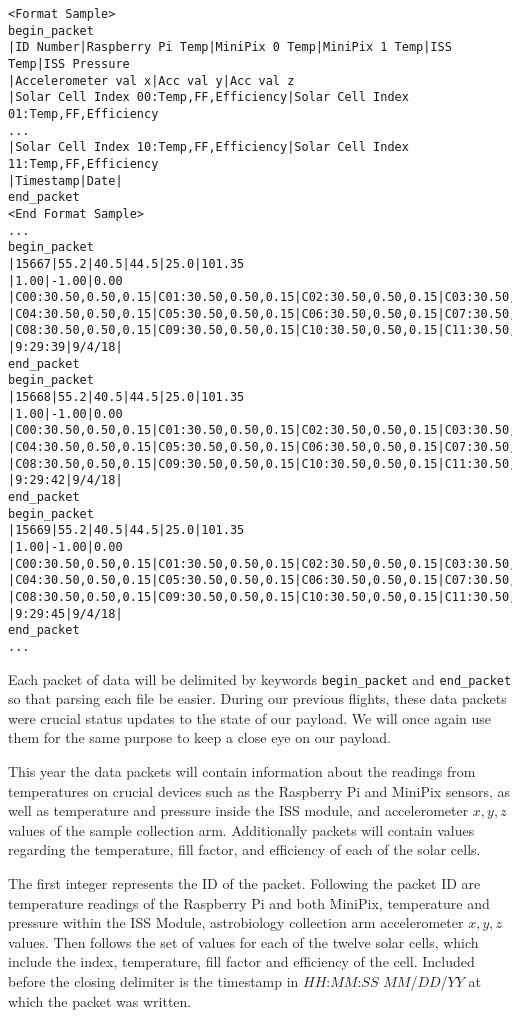 \lstset{basicstyle=\small, numbers=left, xleftmargin=2em, frame=tb, label = Downlinks, framexleftmargin=1.5em}
\begin{lstlisting}[caption = Sample of proposed downlink data packets ID: 15667 - 15670]
<Format Sample>
begin_packet
|ID Number|Raspberry Pi Temp|MiniPix 0 Temp|MiniPix 1 Temp|ISS Temp|ISS Pressure
|Accelerometer val x|Acc val y|Acc val z
|Solar Cell Index 00:Temp,FF,Efficiency|Solar Cell Index 01:Temp,FF,Efficiency
...
|Solar Cell Index 10:Temp,FF,Efficiency|Solar Cell Index 11:Temp,FF,Efficiency
|Timestamp|Date|
end_packet
<End Format Sample>
...
begin_packet
|15667|55.2|40.5|44.5|25.0|101.35
|1.00|-1.00|0.00
|C00:30.50,0.50,0.15|C01:30.50,0.50,0.15|C02:30.50,0.50,0.15|C03:30.50,0.50,0.15
|C04:30.50,0.50,0.15|C05:30.50,0.50,0.15|C06:30.50,0.50,0.15|C07:30.50,0.50,0.15
|C08:30.50,0.50,0.15|C09:30.50,0.50,0.15|C10:30.50,0.50,0.15|C11:30.50,0.50,0.15
|9:29:39|9/4/18|
end_packet
begin_packet
|15668|55.2|40.5|44.5|25.0|101.35
|1.00|-1.00|0.00
|C00:30.50,0.50,0.15|C01:30.50,0.50,0.15|C02:30.50,0.50,0.15|C03:30.50,0.50,0.15
|C04:30.50,0.50,0.15|C05:30.50,0.50,0.15|C06:30.50,0.50,0.15|C07:30.50,0.50,0.15
|C08:30.50,0.50,0.15|C09:30.50,0.50,0.15|C10:30.50,0.50,0.15|C11:30.50,0.50,0.15
|9:29:42|9/4/18|
end_packet
begin_packet
|15669|55.2|40.5|44.5|25.0|101.35
|1.00|-1.00|0.00
|C00:30.50,0.50,0.15|C01:30.50,0.50,0.15|C02:30.50,0.50,0.15|C03:30.50,0.50,0.15
|C04:30.50,0.50,0.15|C05:30.50,0.50,0.15|C06:30.50,0.50,0.15|C07:30.50,0.50,0.15
|C08:30.50,0.50,0.15|C09:30.50,0.50,0.15|C10:30.50,0.50,0.15|C11:30.50,0.50,0.15
|9:29:45|9/4/18|
end_packet
...
\end{lstlisting}
\medskip

Each packet of data will be delimited by keywords \verb|begin_packet| and \verb|end_packet| so that parsing each file be easier.  During our previous flights, these data packets were crucial status updates to the state of our payload.  We will once again use them for the same purpose to keep a close eye on our payload.

This year the data packets will contain information about the readings from temperatures on crucial devices such as the Raspberry Pi and MiniPix sensors, as well as temperature and pressure inside the ISS module, and accelerometer $x, y, z$ values of the sample collection arm. Additionally packets will contain values regarding the temperature, fill factor, and efficiency of each of the solar cells.

The first integer represents the ID of the packet.  Following the packet ID are temperature readings of the Raspberry Pi and both MiniPix, temperature and pressure within the ISS Module, astrobiology collection arm accelerometer $x, y, z$ values. Then follows the set of values for each of the twelve solar cells, which include the index, temperature, fill factor and efficiency of the cell. Included before the closing delimiter is the timestamp in $HH$:$MM$:$SS$ $MM$/$DD$/$YY$ at which the packet was written.




